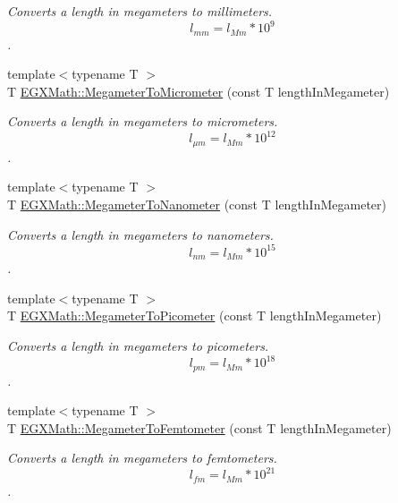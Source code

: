 \begin{DoxyCompactItemize}
\begin{DoxyCompactList}\small\item\em Converts a length in megameters to millimeters. \[ l_{mm}=l_{Mm} * 10^{9} \]. \end{DoxyCompactList}\item 
{\footnotesize template$<$typename T $>$ }\\T \mbox{\hyperlink{group___e_g_x_math-_conversions-_length_conversions-_megameter-_s_i_ga4b0dc1e6dd503c23428038a69ff07146}{E\+G\+X\+Math\+::\+Megameter\+To\+Micrometer}} (const T length\+In\+Megameter)
\begin{DoxyCompactList}\small\item\em Converts a length in megameters to micrometers. \[ l_{\mu m}=l_{Mm} * 10^{12} \]. \end{DoxyCompactList}\item 
{\footnotesize template$<$typename T $>$ }\\T \mbox{\hyperlink{group___e_g_x_math-_conversions-_length_conversions-_megameter-_s_i_ga4b35e7fac8eeb2e9e6db36a4c63e3073}{E\+G\+X\+Math\+::\+Megameter\+To\+Nanometer}} (const T length\+In\+Megameter)
\begin{DoxyCompactList}\small\item\em Converts a length in megameters to nanometers. \[ l_{nm}=l_{Mm} * 10^{15} \]. \end{DoxyCompactList}\item 
{\footnotesize template$<$typename T $>$ }\\T \mbox{\hyperlink{group___e_g_x_math-_conversions-_length_conversions-_megameter-_s_i_ga0f6585bdcd16b6748b6c4d9116dd955c}{E\+G\+X\+Math\+::\+Megameter\+To\+Picometer}} (const T length\+In\+Megameter)
\begin{DoxyCompactList}\small\item\em Converts a length in megameters to picometers. \[ l_{pm}=l_{Mm} * 10^{18} \]. \end{DoxyCompactList}\item 
{\footnotesize template$<$typename T $>$ }\\T \mbox{\hyperlink{group___e_g_x_math-_conversions-_length_conversions-_megameter-_s_i_gad53a3da18100c2bb2d12ecb9178ae597}{E\+G\+X\+Math\+::\+Megameter\+To\+Femtometer}} (const T length\+In\+Megameter)
\begin{DoxyCompactList}\small\item\em Converts a length in megameters to femtometers. \[ l_{fm}=l_{Mm} * 10^{21} \]. \end{DoxyCompactList}\item 

\end{DoxyCompactItemize}
